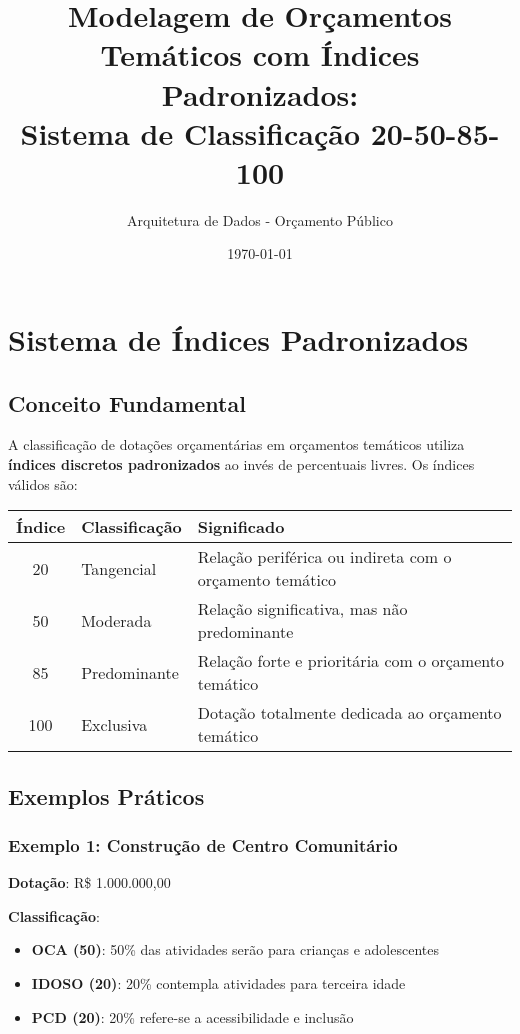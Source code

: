 \documentclass[12pt,a4paper]{article}
\title{Modelagem de Orçamentos Temáticos com Índices Padronizados:\\Sistema de Classificação 20-50-85-100}
\author{Arquitetura de Dados - Orçamento Público}
\date{\today}
\begin{document}
\maketitle

\tableofcontents
\newpage

\section{Sistema de Índices Padronizados}

\subsection{Conceito Fundamental}

A classificação de dotações orçamentárias em orçamentos temáticos utiliza \textbf{índices discretos padronizados} ao invés de percentuais livres. Os índices válidos são:

\begin{center}
\begin{tabular}{|c|l|p{8cm}|}
\hline
\textbf{Índice} & \textbf{Classificação} & \textbf{Significado} \\
\hline
20 & Tangencial & Relação periférica ou indireta com o orçamento temático \\
\hline
50 & Moderada & Relação significativa, mas não predominante \\
\hline
85 & Predominante & Relação forte e prioritária com o orçamento temático \\
\hline
100 & Exclusiva & Dotação totalmente dedicada ao orçamento temático \\
\hline
\end{tabular}
\end{center}

\subsection{Exemplos Práticos}

\subsubsection{Exemplo 1: Construção de Centro Comunitário}

\textbf{Dotação}: R\$ 1.000.000,00

\textbf{Classificação}:
\begin{itemize}
    \item \textbf{OCA (50)}: 50\% das atividades serão para crianças e adolescentes
    \item \textbf{IDOSO (20)}: 20\% contempla atividades para terceira idade
    \item \textbf{PCD (20)}: 20\% refere-se a acessibilidade e inclusão
\end{itemize}
\end{document}
